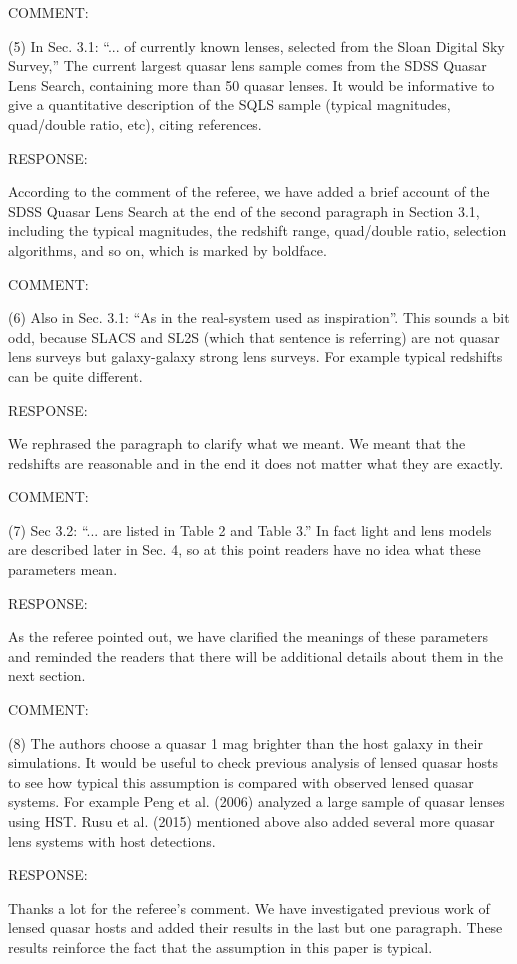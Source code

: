 \documentclass[a4paper,11pt]{article}
\begin{document}
COMMENT:

(5) In Sec. 3.1: ``... of currently known lenses, selected 
from the Sloan Digital Sky Survey,'' The current largest quasar lens sample 
comes from the SDSS Quasar Lens Search, containing more than 50 quasar lenses. 
It would be informative to give a quantitative description of the SQLS sample 
(typical magnitudes, quad/double ratio, etc), citing references.


RESPONSE:

According to the comment of the referee, we have added 
a brief account of the SDSS Quasar Lens Search 
at the end of the second paragraph in Section 3.1, 
including the typical magnitudes, the redshift range, quad/double ratio, 
selection algorithms, and so on, which is marked by boldface.

COMMENT:

(6) Also in Sec. 3.1: ``As in the real-system used as inspiration''. 
This sounds a bit odd, because SLACS and SL2S (which that sentence is referring) 
are not quasar lens surveys but galaxy-galaxy strong lens surveys. 
For example typical redshifts can be quite different.


RESPONSE:

We rephrased the paragraph to clarify what we meant. We meant that the
redshifts are reasonable and in the end it does not matter what they
are exactly.


COMMENT:

(7) Sec 3.2: ``... are listed in Table 2 and Table 3.'' In fact light and lens models 
are described later in Sec. 4, so at this point readers have no idea what these parameters mean.


RESPONSE:

As the referee pointed out, we have clarified the meanings of these parameters 
and reminded the readers that there will be additional details about them 
in the next section.


COMMENT:

(8) The authors choose a quasar 1 mag brighter than the host galaxy in their simulations. 
It would be useful to check previous analysis of lensed quasar hosts 
to see how typical this assumption is compared with observed lensed quasar systems. 
For example Peng et al. (2006) analyzed a large sample of quasar lenses using HST. 
Rusu et al. (2015) mentioned above also added several more quasar lens systems with host detections.


RESPONSE:

Thanks a lot for the referee's comment. We have investigated previous work of 
lensed quasar hosts and added their results in the last but one paragraph. 
These results reinforce the fact that the assumption in this paper is typical.
\end{document}
